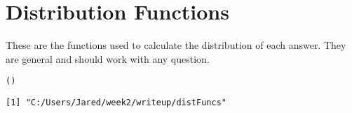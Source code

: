 \documentclass{article}\usepackage{knitr}
\title{\myTitle}
\author{Richard Garfield\\ Columbia University School of Nursing \and Jared P. Lander\\ JP Lander Consulting}
\begin{document}
\maketitle      %
\tableofcontents    %







\section{Distribution Functions}
\label{sec:DistributionFunctions}
These are the functions used to calculate the distribution of each answer. They are general and should work with any question.

\begin{knitrout}
\color{fgcolor}\begin{kframe}
\begin{alltt}
()
\end{alltt}
\begin{verbatim}
[1] "C:/Users/Jared/week2/writeup/distFuncs"
\end{verbatim}
\end{kframe}
\end{knitrout}
\end{document}
